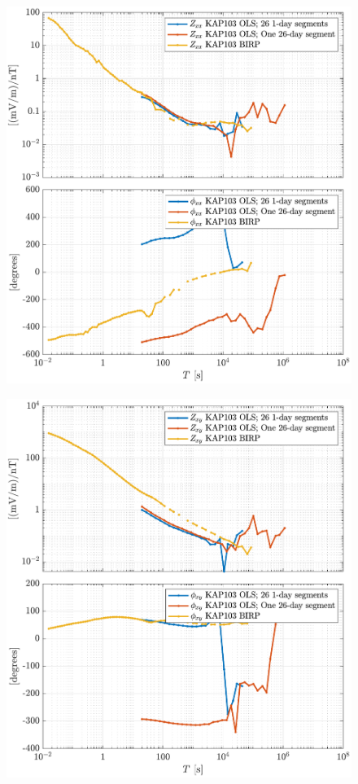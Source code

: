 \documentclass{article}
\begin{document}
\clearpage

\begin{figure}[h!]
\centering
\includegraphics[width=\textwidth]{figures/KAP103/transferfnZ_compare-Z_xx_Magnitude_Phase.pdf}
\caption{}
\end{figure}


\clearpage

\begin{figure}[h!]
\centering
\includegraphics[width=\textwidth]{figures/KAP103/transferfnZ_compare-Z_xy_Magnitude_Phase.pdf}
\caption{}
\label{fig:universe}
\end{figure}
\end{document}
